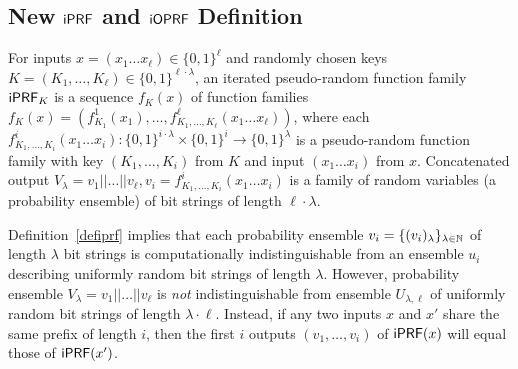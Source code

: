 \subsection{New $\iprf$ and $\mathsf{i}\mathsf{OPRF}$ Definition}
\begin{definition}[$\iprf$]\label{defiprf}
  For inputs $x=(x_1\ldots{}x_\ell)\in\{0,1\}^\ell$ and randomly
  chosen keys $K=(K_1,\ldots,K_\ell)\in\{0,1\}^{\ell\cdot\lambda}$, an
  iterated pseudo-random function family $\mathsf{i}\mathsf{PRF}_K$ is a sequence
  $f_K(x)$ of function families
  $f_K(x)=(f^1_{K_1}(x_{1}),\ldots,f^\ell_{K_1,\ldots,K_\ell}(x_{1}\ldots{}x_{\ell}))$,
  where each
  $f^i_{K_1,\ldots,K_i}(x_{1}\ldots{}x_{i}):\{0,1\}^{i\cdot\lambda}\times\{0,1\}^{i}\rightarrow{}\{0,1\}^\lambda$
  is a pseudo-random function family with key $(K_1,\ldots,K_i)$ from
  $K$ and input $(x_1\ldots{}x_i)$ from $x$. Concatenated output
  $V_\lambda=v_1||\ldots||v_\ell,v_i=f^i_{K_1,\ldots,K_i}(x_1\ldots{}x_i)$
  is a family of random variables (a probability ensemble) of bit
  strings of length $\ell\cdot\lambda$.

\end{definition}

Definition~\ref{defiprf} implies that each probability ensemble
$v_i=\{(v_i)_\lambda\}_{\lambda\in{\mathbb{N}}}$ of length $\lambda$ bit strings
is computationally indistinguishable from an ensemble $u_i$ describing
uniformly random bit strings of length $\lambda$. However, probability
ensemble $V_\lambda=v_1||\ldots||v_\ell$ is \emph{not}
indistinguishable from ensemble $U_{\lambda,\ell}$ of uniformly random
bit strings of length $\lambda\cdot\ell$. Instead, if any two inputs
$x$ and $x'$ share the same prefix of length $i$, then the first $i$
outputs $(v_1,\ldots,v_i)$ of $\mathsf{i}\mathsf{PRF}(x)$ will equal those of
$\mathsf{i}\mathsf{PRF}(x')$.  

